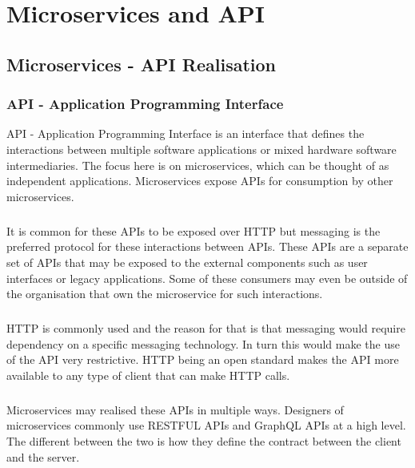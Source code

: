 \documentclass[a4paper, 11pt]{book}
\begin{document}


    \chapter{Microservices and API}

    \section{Microservices - API Realisation}

    \subsection{API - Application Programming Interface}
    API - Application Programming Interface is an interface that defines the interactions between multiple software applications or mixed hardware software intermediaries.
    The focus here is on microservices, which can be thought of as independent applications.
    Microservices expose APIs for consumption by other microservices.

    \paragraph{}
    It is common for these APIs to be exposed over HTTP but messaging is the preferred protocol for these interactions between APIs.
    These APIs are a separate set of APIs that may be exposed to the external components such as user interfaces or legacy applications.
    Some of these consumers may even be outside of the organisation that own the microservice for such interactions.

    \paragraph{}
    HTTP is commonly used and the reason for that is that messaging would require dependency on a specific messaging technology.
    In turn this would make the use of the API very restrictive.
    HTTP being an open standard makes the API more available to any type of client that can make HTTP calls.

    \paragraph{}
    Microservices may realised these APIs in multiple ways.
    Designers of microservices commonly use RESTFUL APIs and GraphQL APIs at a high level.
    The different between the two is how they define the contract between the client and the server.
\end{document}
